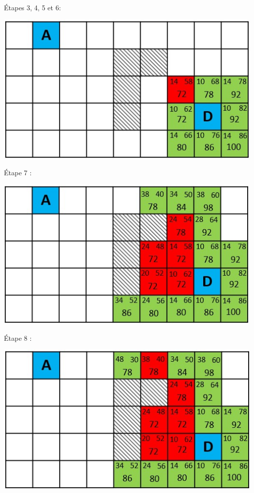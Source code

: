 \newpage
\'Etapes 3, 4, 5 et 6:
\begin{center}
\includegraphics[scale=0.8]{images/quadri4.jpg}
\end{center}

\'Etape 7 :
\begin{center}
\includegraphics[scale=0.8]{images/quadri9.jpg}
\end{center}


\'Etape 8 :
\begin{center}
\includegraphics[scale=0.8]{images/quadri10.jpg}
\end{center}

